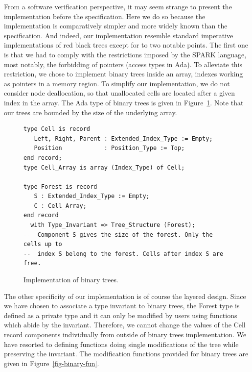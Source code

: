 \documentclass[11pt,a4paper]{article}
\begin{document}
From a software verification perspective, it may seem strange to present the implementation
before the specification. Here we do so because the implementation is comparatively
simpler and more widely known than the specification. And indeed, our implementation
resemble standard imperative implementations of red black trees except for to two notable
points. The first one is that we had to comply with the restrictions imposed by the
SPARK language, most notably, the forbidding of pointers (access types in Ada). To
alleviate this restriction, we chose to implement binary trees inside an array, indexes
working as pointers in a memory region. To simplify our implementation, we do not consider
node deallocation, so that unallocated cells are located after a given index in the array.
The Ada type of binary trees is given in Figure~\ref{fig-binary-typ}.
Note that our trees are bounded by the size of the underlying array.

\begin{figure}[ht]
\begin{small}
\begin{lstlisting}
type Cell is record
   Left, Right, Parent : Extended_Index_Type := Empty;
   Position            : Position_Type := Top;
end record;
type Cell_Array is array (Index_Type) of Cell;

type Forest is record
   S : Extended_Index_Type := Empty;
   C : Cell_Array;
end record
  with Type_Invariant => Tree_Structure (Forest);
--  Component S gives the size of the forest. Only the cells up to
--  index S belong to the forest. Cells after index S are free.
\end{lstlisting}
\end{small}
\caption{\label{fig-binary-typ} Implementation of binary trees.}
\end{figure}

The other specificity of our implementation is of course the layered design. Since we
have chosen to associate a type invariant to binary trees, the Forest type is defined as
a private type and it can only be modified by users using functions which abide by the
invariant. Therefore, we cannot change the values of the Cell record components individually
from outside of binary trees implementation. We have resorted to defining functions
doing single modifications of the tree while preserving the invariant. The modification
functions provided for binary trees are given in Figure~\ref{fig-binary-fun}.
\end{document}
